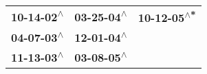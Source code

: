 \begin{supertabular}{lll}
 \textbf{10-14-02\textsuperscript{$\wedge$}} &  \textbf{03-25-04\textsuperscript{$\wedge$}} &  \textbf{10-12-05\textsuperscript{$\wedge$*}} \\
 \textbf{04-07-03\textsuperscript{$\wedge$}} &  \textbf{12-01-04\textsuperscript{$\wedge$}} &                                               \\
 \textbf{11-13-03\textsuperscript{$\wedge$}} &  \textbf{03-08-05\textsuperscript{$\wedge$}} &                                               \\
\end{supertabular}
